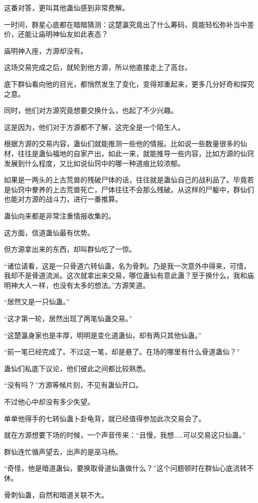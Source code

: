 \begin{this_body}
这番对答，更叫其他蛊仙感到非常费解。

一时间，群星心底都在暗暗猜测：这楚瀛究竟出了什么筹码，竟能轻松弥补当中差价，还能让庙明神仙友如此表态？

庙明神入座，方源却没有。

这场交易完成之后，就轮到他方源，所以他直接走上了高台。

底下群仙看向他的目光，都悄然发生了变化，变得郑重起来，更多几分好奇和探究之意。

同时，他们对方源究竟想要交换什么，也起了不少兴趣。

这是因为，他们对于方源都不了解，这完全是一个陌生人。

根据方源的交易内容，蛊仙们就能推测一些他的情报。比如说一些数量很多的仙材，往往是蛊仙福地的自家产出，如此一来，就能推导一些内容，比如方源的仙窍发展到什么程度，又比如说仙窍中的哪一种道痕比较浓郁。

如果是一两头的上古荒兽的残破尸体的话，往往就是蛊仙自己的战利品了。毕竟若是仙窍中豢养的上古荒兽死亡，尸体往往不会那么残破。从这样的尸躯中，群仙们也能对方源的战斗力，进行一番推算。

蛊仙向来都是非常注重情报收集的。

这方面，信道蛊仙最有优势。

但方源拿出来的东西，却叫群仙吃了一惊。

“诸位请看，这是一只骨道六转仙蛊，名为骨刺。乃是我一次意外中得来，可惜，我却不是骨道流派。这次就拿出来交易，哪位蛊仙有意此蛊？至于换什么，我和庙明神大人一样，也没有太多的想法。”方源笑道。

“居然又是一只仙蛊。”

“这才第一轮，居然出现了两笔仙蛊交易。”

“这楚瀛身家也是丰厚，明明是变化道蛊仙，却有两只其他仙蛊。”

“前一笔已经完成了。不过这一笔，却是悬了。在场的哪里有什么骨道蛊仙？”

蛊仙们私底下议论，他们彼此之间都比较熟悉。

“没有吗？”方源等候片刻，不见有蛊仙开口。

不过他心中却没有多少失望。

单单他得手的七转仙蛊卜卦龟背，就已经值得参加此次交易会了。

就在方源想要下场的时候，一个声音传来：“且慢，我想……可以交易这只仙蛊。”

群仙连忙循声望去，出声的是巫马杨。

“奇怪，他是暗道蛊仙，要换取骨道仙蛊做什么？”这个问题顿时在群仙心底流转不休。

骨刺仙蛊，自然和暗道关联不大。


\end{this_body}
